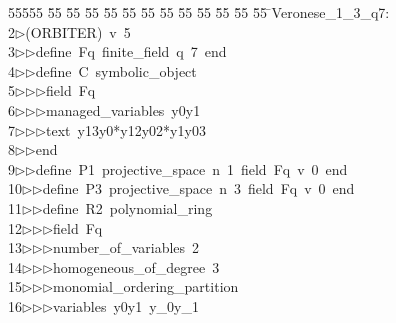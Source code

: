 %
%
\begin{tabbing}
55555 \= 55 \= 55 \= 55 \= 55 \= 55 \= 55 \= 55 \= 55 \= 55 \= 55 \= 55 \= 55 \= \>Veronese\_1\_3\_q7:\\[0pt]
2\>$\triangleright$\>(ORBITER)\ v\ 5\ \\[0pt]
3\>$\triangleright$\>$\triangleright$\>define\ Fq\ finite\_field\ q\ 7\ end\ \\[0pt]
4\>$\triangleright$\>$\triangleright$\>define\ C\ symbolic\_object\ \\[0pt]
5\>$\triangleright$\>$\triangleright$\>$\triangleright$\>field\ Fq\ \\[0pt]
6\>$\triangleright$\>$\triangleright$\>$\triangleright$\>managed\_variables\ y0y1\ \\[0pt]
7\>$\triangleright$\>$\triangleright$\>$\triangleright$\>text\ y13y0*y12y02*y1y03\ \\[0pt]
8\>$\triangleright$\>$\triangleright$\>end\ \\[0pt]
9\>$\triangleright$\>$\triangleright$\>define\ P1\ projective\_space\ n\ 1\ field\ Fq\ v\ 0\ end\ \\[0pt]
10\>$\triangleright$\>$\triangleright$\>define\ P3\ projective\_space\ n\ 3\ field\ Fq\ v\ 0\ end\ \\[0pt]
11\>$\triangleright$\>$\triangleright$\>define\ R2\ polynomial\_ring\ \\[0pt]
12\>$\triangleright$\>$\triangleright$\>$\triangleright$\>field\ Fq\ \\[0pt]
13\>$\triangleright$\>$\triangleright$\>$\triangleright$\>number\_of\_variables\ 2\ \\[0pt]
14\>$\triangleright$\>$\triangleright$\>$\triangleright$\>homogeneous\_of\_degree\ 3\ \\[0pt]
15\>$\triangleright$\>$\triangleright$\>$\triangleright$\>monomial\_ordering\_partition\ \\[0pt]
16\>$\triangleright$\>$\triangleright$\>$\triangleright$\>variables\ y0y1\ y\_0y\_1\ \\[0pt]

\end{tabbing}
